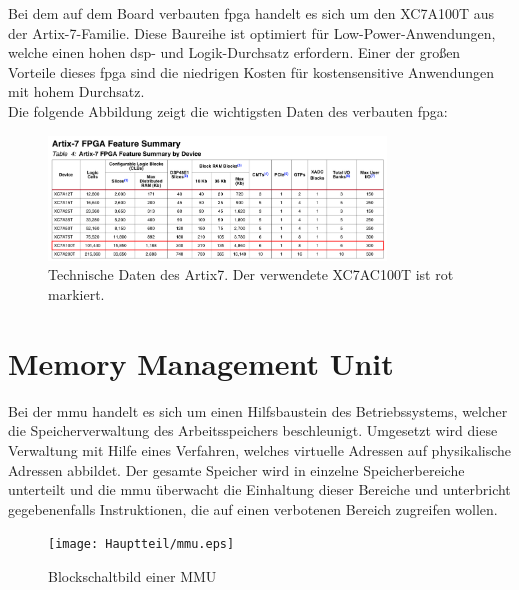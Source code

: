 Bei dem auf dem Board verbauten \ac{fpga} handelt es sich um den  XC7A100T aus der Artix-7-Familie. Diese Baureihe ist optimiert für Low-Power-Anwendungen, welche einen hohen \ac{dsp}- und Logik-Durchsatz erfordern. Einer der großen Vorteile
dieses \ac{fpga} sind die niedrigen Kosten für kostensensitive Anwendungen mit hohem Durchsatz.\\
Die folgende Abbildung zeigt die wichtigsten Daten des verbauten \ac{fpga}:~\cite{artix7}~\cite{artix7}\\


\begin{figure}[H]
\centering
\includegraphics[width=0.8\textwidth]{Hauptteil/artix7.png}
\caption{Technische Daten des Artix7. Der verwendete XC7AC100T ist rot markiert.~\cite{artix7}}\label{fig:artix7}
\end{figure}










\section{Memory Management Unit}\label{kap:mmu}

Bei der \ac{mmu} handelt es sich um einen Hilfsbaustein des Betriebssystems, welcher die Speicherverwaltung des Arbeitsspeichers beschleunigt. Umgesetzt wird diese Verwaltung mit
Hilfe eines Verfahren, welches virtuelle Adressen auf physikalische Adressen abbildet. Der gesamte Speicher wird in einzelne Speicherbereiche unterteilt und die
\ac{mmu} überwacht die Einhaltung dieser Bereiche und unterbricht gegebenenfalls Instruktionen, die auf einen verbotenen
Bereich zugreifen wollen.\cite{itwissen}\\

\begin{figure}[H]
\centering
\texttt{[image: Hauptteil/mmu.eps]}
\caption{Blockschaltbild einer MMU}\label{fig:mmu}
\end{figure}


